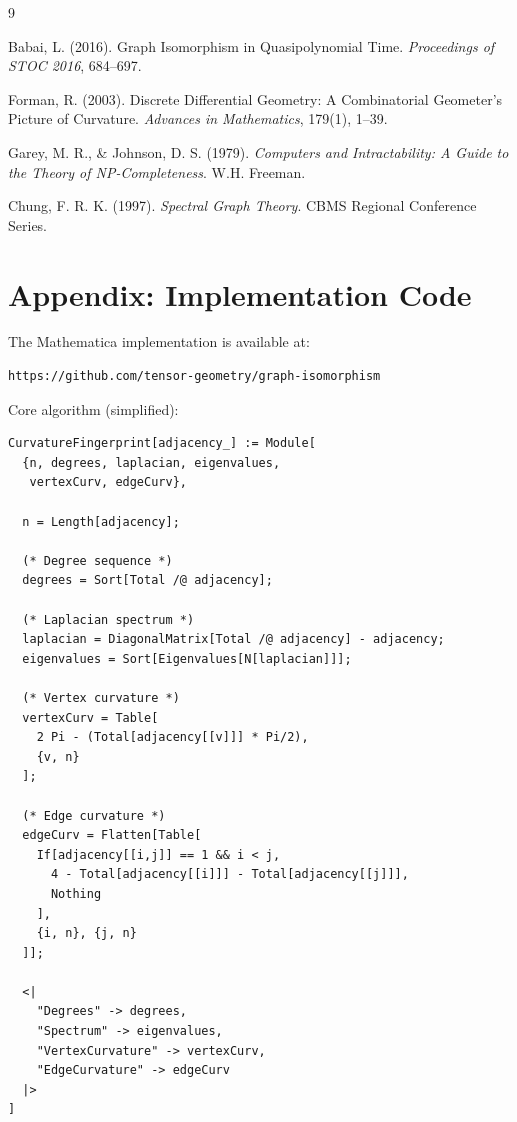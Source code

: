 \documentclass[12pt,a4paper]{article}
\begin{document}

\begin{thebibliography}{9}

Babai, L. (2016). Graph Isomorphism in Quasipolynomial Time. \textit{Proceedings of STOC 2016}, 684--697.

Forman, R. (2003). Discrete Differential Geometry: A Combinatorial Geometer's Picture of Curvature. \textit{Advances in Mathematics}, 179(1), 1--39.

Garey, M. R., \& Johnson, D. S. (1979). \textit{Computers and Intractability: A Guide to the Theory of NP-Completeness}. W.H. Freeman.

Chung, F. R. K. (1997). \textit{Spectral Graph Theory}. CBMS Regional Conference Series.

\end{thebibliography}

\appendix

\section{Appendix: Implementation Code}

The Mathematica implementation is available at:
\begin{verbatim}
https://github.com/tensor-geometry/graph-isomorphism
\end{verbatim}

Core algorithm (simplified):
\begin{verbatim}
CurvatureFingerprint[adjacency_] := Module[
  {n, degrees, laplacian, eigenvalues, 
   vertexCurv, edgeCurv},
  
  n = Length[adjacency];
  
  (* Degree sequence *)
  degrees = Sort[Total /@ adjacency];
  
  (* Laplacian spectrum *)
  laplacian = DiagonalMatrix[Total /@ adjacency] - adjacency;
  eigenvalues = Sort[Eigenvalues[N[laplacian]]];
  
  (* Vertex curvature *)
  vertexCurv = Table[
    2 Pi - (Total[adjacency[[v]]] * Pi/2),
    {v, n}
  ];
  
  (* Edge curvature *)
  edgeCurv = Flatten[Table[
    If[adjacency[[i,j]] == 1 && i < j,
      4 - Total[adjacency[[i]]] - Total[adjacency[[j]]],
      Nothing
    ],
    {i, n}, {j, n}
  ]];
  
  <|
    "Degrees" -> degrees,
    "Spectrum" -> eigenvalues,
    "VertexCurvature" -> vertexCurv,
    "EdgeCurvature" -> edgeCurv
  |>
]
\end{verbatim}
\end{document}

